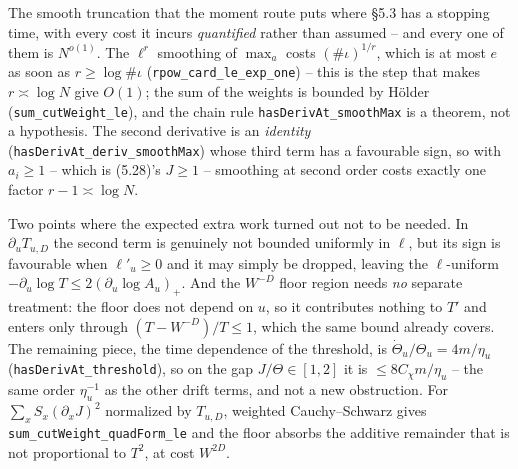 \begin{lemma}\label{lem:cutoff-bounds}
  \leanok{}
  The smooth truncation that the moment route puts where \S5.3 has a stopping time, with every
  cost it incurs \emph{quantified} rather than assumed -- and every one of them is $N^{o(1)}$.
  The $\ell^r$ smoothing of $\max_a$ costs $(\#\iota)^{1/r}$, which is at most $e$ as soon as
  $r\ge\log\#\iota$ (\texttt{rpow\_card\_le\_exp\_one}) -- this is the step that makes
  $r\asymp\log N$ give $O(1)$; the sum of the weights is bounded by H\"older
  (\texttt{sum\_cutWeight\_le}), and the chain rule \texttt{hasDerivAt\_smoothMax} is a theorem,
  not a hypothesis.  The second derivative is an \emph{identity}
  (\texttt{hasDerivAt\_deriv\_smoothMax}) whose third term has a favourable sign, so with
  $a_i\ge1$ -- which is (5.28)'s $J\ge1$ -- smoothing at second order costs exactly one factor
  $r-1\asymp\log N$.

  Two points where the expected extra work turned out not to be needed.  In $\partial_uT_{u,D}$
  the second term is genuinely not bounded uniformly in $\ell$, but its sign is favourable when
  $\ell'_u\ge0$ and it may simply be dropped, leaving the $\ell$-uniform
  $-\partial_u\log T\le2(\partial_u\log A_u)_+$.  And the $W^{-D}$ floor region needs \emph{no}
  separate treatment: the floor does not depend on $u$, so it contributes nothing to $T'$ and
  enters only through $(T-W^{-D})/T\le1$, which the same bound already covers.  The remaining
  piece, the time dependence of the threshold, is
  $\dot\Theta_u/\Theta_u=4m/\eta_u$ (\texttt{hasDerivAt\_threshold}), so on the gap
  $J/\Theta\in[1,2]$ it is $\le8C_\chi m/\eta_u$ -- the same order $\eta_u^{-1}$ as the other
  drift terms, and not a new obstruction.  For $\sum_xS_x(\partial_xJ)^2$ normalized by
  $T_{u,D}$, weighted Cauchy--Schwarz gives \texttt{sum\_cutWeight\_quadForm\_le} and the floor
  absorbs the additive remainder that is not proportional to $T^2$, at cost $W^{2D}$.


\end{lemma}
